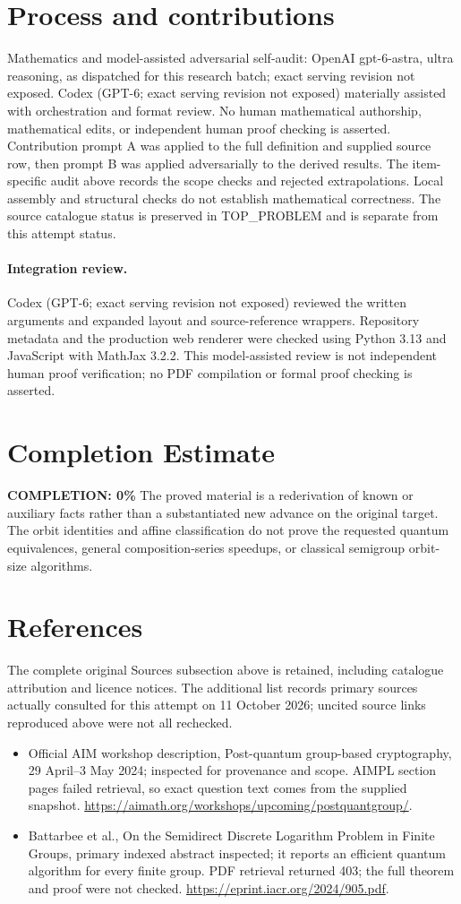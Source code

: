 \documentclass[11pt]{article}
\begin{document}
\section{Process and contributions}
Mathematics and model-assisted adversarial self-audit: OpenAI gpt-6-astra, ultra reasoning, as dispatched for this research batch; exact serving revision not exposed. Codex (GPT-6; exact serving revision not exposed) materially assisted with orchestration and format review. No human mathematical authorship, mathematical edits, or independent human proof checking is asserted.
Contribution prompt A was applied to the full definition and supplied source row, then prompt B was applied adversarially to the derived results. The item-specific audit above records the scope checks and rejected extrapolations. Local assembly and structural checks do not establish mathematical correctness. The source catalogue status is preserved in TOP\_PROBLEM and is separate from this attempt status.
\paragraph{Integration review.} Codex (GPT-6; exact serving revision not exposed) reviewed the written arguments and expanded layout and source-reference wrappers. Repository metadata and the production web renderer were checked using Python 3.13 and JavaScript with MathJax 3.2.2. This model-assisted review is not independent human proof verification; no PDF compilation or formal proof checking is asserted.

\section{Completion Estimate}
\noindent\textbf{COMPLETION: 0\%}
The proved material is a rederivation of known or auxiliary facts rather than a substantiated new advance on the original target. The orbit identities and affine classification do not prove the requested quantum equivalences, general composition-series speedups, or classical semigroup orbit-size algorithms.
\section{References}
The complete original Sources subsection above is retained, including catalogue attribution and licence notices. The additional list records primary sources actually consulted for this attempt on 11 October 2026; uncited source links reproduced above were not all rechecked.
\begin{itemize}
\item Official AIM workshop description, Post-quantum group-based cryptography, 29 April--3 May 2024; inspected for provenance and scope. AIMPL section pages failed retrieval, so exact question text comes from the supplied snapshot. \url{https://aimath.org/workshops/upcoming/postquantgroup/}.
\item Battarbee et al., On the Semidirect Discrete Logarithm Problem in Finite Groups, primary indexed abstract inspected; it reports an efficient quantum algorithm for every finite group. PDF retrieval returned 403; the full theorem and proof were not checked. \url{https://eprint.iacr.org/2024/905.pdf}.
\end{itemize}
\end{document}
